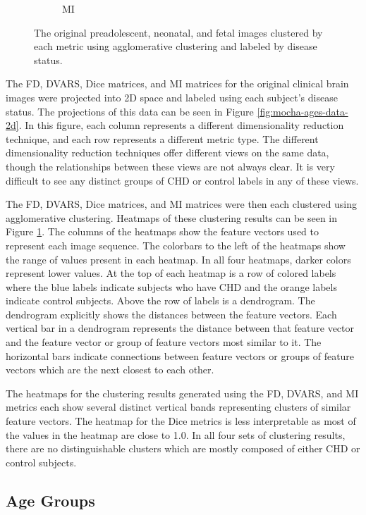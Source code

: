 \begin{figure}[t!]
\begin{subfigure}{0.45\textwidth}
		\caption{MI}
	\end{subfigure}
\vspace{-10mm}
\caption{The original preadolescent, neonatal, and fetal images clustered by each metric using agglomerative clustering and labeled by disease status.}
\label{fig:mocha-cohorts-sns-agg}
\end{figure}

The FD, DVARS, Dice matrices, and MI matrices for the original clinical brain images were projected into 2D space and labeled using each subject's disease status. The projections of this data can be seen in Figure \ref{fig:mocha-ages-data-2d}. In this figure, each column represents a different dimensionality reduction technique, and each row represents a different metric type. The different dimensionality reduction techniques offer different views on the same data, though the relationships between these views are not always clear. It is very difficult to see any distinct groups of CHD or control labels in any of these views.

The FD, DVARS, Dice matrices, and MI matrices were then each clustered using agglomerative clustering. Heatmaps of these clustering results can be seen in Figure \ref{fig:mocha-cohorts-sns-agg}. The columns of the heatmaps show the feature vectors used to represent each image sequence. The colorbars to the left of the heatmaps show the range of values present in each heatmap. In all four heatmaps, darker colors represent lower values. At the top of each heatmap is a row of colored labels where the blue labels indicate subjects who have CHD and the orange labels indicate control subjects. Above the row of labels is a dendrogram. The dendrogram explicitly shows the distances between the feature vectors. Each vertical bar in a dendrogram represents the distance between that feature vector and the feature vector or group of feature vectors most similar to it. The horizontal bars indicate connections between feature vectors or groups of feature vectors which are the next closest to each other.

The heatmaps for the clustering results generated using the FD, DVARS, and MI metrics each show several distinct vertical bands representing clusters of similar feature vectors. The heatmap for the Dice metrics is less interpretable as most of the values in the heatmap are close to 1.0. In all four sets of clustering results, there are no distinguishable clusters which are mostly composed of either CHD or control subjects.

\subsection{Age Groups}

